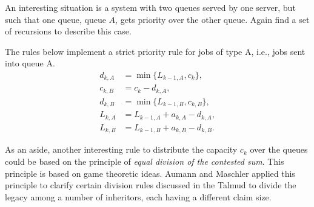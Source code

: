   \begin{exercise}  An interesting situation is a system with two queues served by one server, but such that one queue, queue $A$, gets priority over the other queue.
    Again find a set of recursions to describe this case.
    \begin{solution}
      The rules below implement a strict priority rule for jobs of type
      A, i.e., jobs sent into queue A.
\begin{equation*}
  \begin{split}
    d_{k,A} &= \min\{L_{k-1, A}, c_k\}, \\
    c_{k,B} &= c_k - d_{k,A}, \\
    d_{k,B} &= \min\{L_{k-1, B}, c_{k,B}\}, \\
    L_{k,A} &= L_{k-1, A} + a_{k,A} - d_{k,A}, \\
    L_{k,B} &= L_{k-1, B} + a_{k,B} - d_{k,B}.
  \end{split}
\end{equation*}

As an aside, another interesting rule to distribute the capacity $c_k$ over the queues could be based on the principle of \textit{ equal division of the contested sum}.
This principle is based on game theoretic ideas.
Aumann and Maschler applied this principle to clarify certain division rules discussed in the Talmud to divide the legacy among a number of inheritors, each having a different claim size.
    \end{solution}
\end{exercise}



